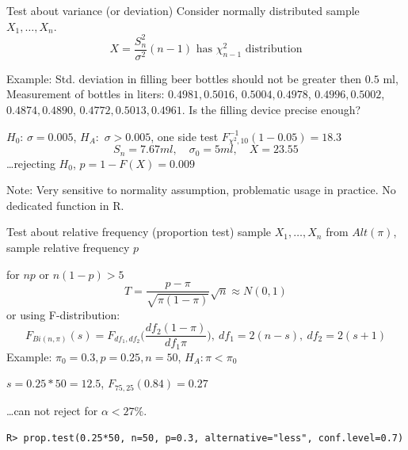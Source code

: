 \documentclass[smaller]{beamer}
\def\blue#1{{\usebeamercolor[fg]{my blue} #1}}
\def\xskip{{\vspace{2ex}}}
\begin{document}
\begin{frame}{Test about variance (or deviation)}
Consider normally distributed sample $X_1, \dots, X_n$.
\[
  X = \frac{S_n^2}{\sigma^2} (n-1) \text{ has $\chi_{n-1}^2$ distribution}
\]

\blue{Example: } Std. deviation in filling beer bottles should not be greater then $0.5$ ml,
Measurement of bottles in liters: $0.4981, 0.5016$, $0.5004, 0.4978$,
$0.4996,0.5002$, $0.4874, 0.4890$, $0.4772, 0.5013, 0.4961$. Is the filling device precise enough?

\xskip
$H_0$: $\sigma = 0.005$, $H_A:$ $\sigma > 0.005$, one side test
$F^{-1}_{\chi^2, 10}(1-0.05) = 18.3$
\[
 S_n = 7.67 ml,\quad \sigma_0 = 5 ml,\quad X=23.55
\]
\dots rejecting $H_0$, $p=1-F(X)=0.009$ 

\xskip
Note: Very sensitive to normality assumption, problematic usage in practice. No dedicated function in R.

\end{frame}



\begin{frame}[fragile]{Test about relative frequency (proportion test)}
sample $X_1,\dots, X_n$ from $Alt(\pi)$, sample relative frequency $p$

\xskip
for $np$ or $n(1-p) > 5$
\[
  T=\frac{p - \pi}{\sqrt{\pi(1-\pi)}}\sqrt{n} \approx N(0,1)
\]
or using F-distribution:
\[
  F_{Bi(n,\pi)}(s) = F_{df_1,df_2} \Big(\frac{df_2(1-\pi)}{df_1\pi}\Big),\ df_1=2(n-s),\ df_2=2(s+1)
\]
\blue{Example:}
$\pi_0 = 0.3, p=0.25, n=50$, $H_A: \pi < \pi_0$

$s=0.25*50=12.5$, $F_{75,25}( 0.84 ) = 0.27$

\dots can not reject for $\alpha <27\%$.

\xskip
{\small
\verb'R> prop.test(0.25*50, n=50, p=0.3, alternative="less", conf.level=0.7)' 
}
\end{frame}
\end{document}

